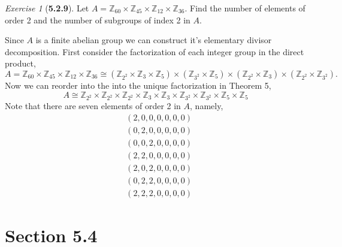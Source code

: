 \documentclass[12pt]{amsart}
\makeatletter
\theoremstyle{remark}
\newtheorem*{exercise}{Exercise}%
\def\ZZ{\ensuremath{\mathbb Z}}
\renewenvironment{proof}[1][\proofname]{\par\doublespacing
  \pushQED{\qed}%
  \normalfont \topsep6\p@\@plus6\p@\relax
  \list{}{%
    \settowidth{\leftmargin}{\itshape\proofname:\hskip\labelsep}%
    \setlength{\labelwidth}{0pt}%
    \setlength{\itemindent}{-\leftmargin}%
  }%
  \item[\hskip\labelsep\itshape#1\@addpunct{:}]\ignorespaces
}{%
  \popQED\endlist\@endpefalse
  \singlespacing
}
\theoremstyle{mycomment}
\makeatother
\begin{document}
\begin{exercise}[\textbf{5.2.9}] Let $A = \ZZ_{60}\times \ZZ_{45}\times \ZZ_{12}\times \ZZ_{36}$. Find the number of elements of order 2
  and the number of subgroups of index 2 in $A$. 
  \begin{proof}[Solution:] Since $A$ is a finite abelian group we can construct it's elementary divisor decomposition. First consider the factorization of each 
    integer group in the direct product, 
    \begin{equation*}
      A = \ZZ_{60}\times \ZZ_{45}\times \ZZ_{12}\times \ZZ_{36} \cong (\ZZ_{2^2}\times \ZZ_{3} \times \ZZ_5) \times (\ZZ_{3^2} \times \ZZ_5) \times (\ZZ_{2^2} \times \ZZ_{3}) \times (\ZZ_{2^2} \times \ZZ_{3^2}). 
    \end{equation*}
    Now we can reorder into the into the unique factorization in Theorem 5, 
    \begin{equation*}
      A \cong \ZZ_{2^2} \times \ZZ_{2^2} \times \ZZ_{2^2} \times \ZZ_{3} \times \ZZ_{3} \times \ZZ_{3^2} \times \ZZ_{3^2} \times \ZZ_{5} \times \ZZ_{5}
    \end{equation*}
    Note that there are seven elements of order 2 in $A$, namely, 
    \begin{align*}
      &(2,0,0,0,0,0,0)\\
      &(0,2,0,0,0,0,0)\\
      &(0,0,2,0,0,0,0)\\
      &(2,2,0,0,0,0,0)\\
      &(2,0,2,0,0,0,0)\\
      &(0,2,2,0,0,0,0)\\
      &(2,2,2,0,0,0,0)
    \end{align*}

      \end{proof}

\end{exercise}
\vspace{.15in}

\section*{\textbf{Section 5.4}}
\end{document}
